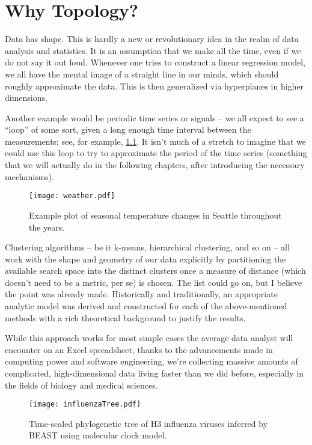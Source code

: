 \chapter{Why Topology?}
\graphicspath{ {/home/tomasp/Dokumenty/Master_Thesis/figures/} }

Data has shape. This is hardly a new or revolutionary idea in the realm of data analysis and statistics. It is an assumption that we make all the time, even if we do not say it out loud. Whenever one tries to construct a linear regression model, we all have the mental image of a straight line in our minds, which should roughly approximate the data. This is then generalized via hyperplanes in higher dimensions.
\par
Another example would be periodic time series or signals -- we all expect to see a ``loop'' of some sort, given a long enough time interval between the measurements; see, for example, \ref{fig:SeattleWeather}. It isn't much of a stretch to imagine that we could use this loop to try to approximate the period of the time series (something that we will actually do in the following chapters, after introducing the necessary mechanisms).

\begin{figure}[h]
  \caption{Example plot of seasonal temperature changes in Seattle throughout the years.}
  \texttt{[image: weather.pdf]}
  \centering
  \label{fig:SeattleWeather}
\end{figure}

Clustering algorithms -- be it k-means, hierarchical clustering, and so on -- all work with the shape and geometry of our data explicitly by partitioning the available search space into the distinct clusters once a measure of distance (which doesn't need to be a metric, per se) is chosen. The list could go on, but I believe the point was already made. Historically and traditionally, an appropriate analytic model was derived and constructed for each of the above-mentioned methods with a rich theoretical background to justify the results.
\par
While this approach works for most simple cases the average data analyst will encounter on an Excel spreadsheet, thanks to the advancements made in computing power and software engineering, we're collecting massive amounts of complicated, high-dimensional data living faster than we did before, especially in the fields of biology and medical sciences.

\begin{figure}[h]
  \caption{Time-scaled phylogenetic tree of H3 influenza viruses inferred by BEAST using molecular clock model.}
  \texttt{[image: influenzaTree.pdf]}
  \centering
  \label{fig:influenzaTree}
\end{figure}

